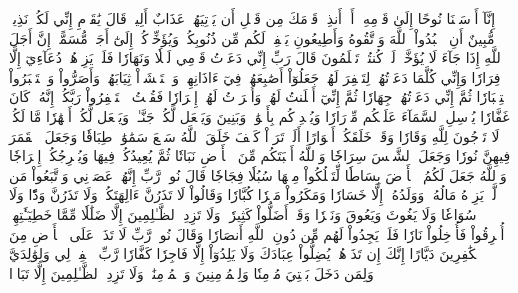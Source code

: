 إِنَّآ أَرۡسَلۡنَا نُوحًا إِلَىٰ قَوۡمِهِۦٓ أَنۡ أَنذِرۡ قَوۡمَكَ مِن قَبۡلِ أَن يَأۡتِيَهُمۡ عَذَابٌ أَلِيمٞ
قَالَ يَٰقَوۡمِ إِنِّي لَكُمۡ نَذِيرٞ مُّبِينٌ
أَنِ ٱعۡبُدُواْ ٱللَّهَ وَٱتَّقُوهُ وَأَطِيعُونِ
يَغۡفِرۡ لَكُم مِّن ذُنُوبِكُمۡ وَيُؤَخِّرۡكُمۡ إِلَىٰٓ أَجَلٖ مُّسَمًّىۚ إِنَّ أَجَلَ ٱللَّهِ إِذَا جَآءَ لَا يُؤَخَّرُۚ لَوۡ كُنتُمۡ تَعۡلَمُونَ
قَالَ رَبِّ إِنِّي دَعَوۡتُ قَوۡمِي لَيۡلٗا وَنَهَارٗا
فَلَمۡ يَزِدۡهُمۡ دُعَآءِيٓ إِلَّا فِرَارٗا
وَإِنِّي كُلَّمَا دَعَوۡتُهُمۡ لِتَغۡفِرَ لَهُمۡ جَعَلُوٓاْ أَصَٰبِعَهُمۡ فِيٓ ءَاذَانِهِمۡ وَٱسۡتَغۡشَوۡاْ ثِيَابَهُمۡ وَأَصَرُّواْ وَٱسۡتَكۡبَرُواْ ٱسۡتِكۡبَارٗا
ثُمَّ إِنِّي دَعَوۡتُهُمۡ جِهَارٗا
ثُمَّ إِنِّيٓ أَعۡلَنتُ لَهُمۡ وَأَسۡرَرۡتُ لَهُمۡ إِسۡرَارٗا
فَقُلۡتُ ٱسۡتَغۡفِرُواْ رَبَّكُمۡ إِنَّهُۥ كَانَ غَفَّارٗا
يُرۡسِلِ ٱلسَّمَآءَ عَلَيۡكُم مِّدۡرَارٗا
وَيُمۡدِدۡكُم بِأَمۡوَٰلٖ وَبَنِينَ وَيَجۡعَل لَّكُمۡ جَنَّـٰتٖ وَيَجۡعَل لَّكُمۡ أَنۡهَٰرٗا
مَّا لَكُمۡ لَا تَرۡجُونَ لِلَّهِ وَقَارٗا
وَقَدۡ خَلَقَكُمۡ أَطۡوَارًا
أَلَمۡ تَرَوۡاْ كَيۡفَ خَلَقَ ٱللَّهُ سَبۡعَ سَمَٰوَٰتٖ طِبَاقٗا
وَجَعَلَ ٱلۡقَمَرَ فِيهِنَّ نُورٗا وَجَعَلَ ٱلشَّمۡسَ سِرَاجٗا
وَٱللَّهُ أَنۢبَتَكُم مِّنَ ٱلۡأَرۡضِ نَبَاتٗا
ثُمَّ يُعِيدُكُمۡ فِيهَا وَيُخۡرِجُكُمۡ إِخۡرَاجٗا
وَٱللَّهُ جَعَلَ لَكُمُ ٱلۡأَرۡضَ بِسَاطٗا
لِّتَسۡلُكُواْ مِنۡهَا سُبُلٗا فِجَاجٗا
قَالَ نُوحٞ رَّبِّ إِنَّهُمۡ عَصَوۡنِي وَٱتَّبَعُواْ مَن لَّمۡ يَزِدۡهُ مَالُهُۥ وَوَلَدُهُۥٓ إِلَّا خَسَارٗا
وَمَكَرُواْ مَكۡرٗا كُبَّارٗا
وَقَالُواْ لَا تَذَرُنَّ ءَالِهَتَكُمۡ وَلَا تَذَرُنَّ وَدّٗا وَلَا سُوَاعٗا وَلَا يَغُوثَ وَيَعُوقَ وَنَسۡرٗا
وَقَدۡ أَضَلُّواْ كَثِيرٗاۖ وَلَا تَزِدِ ٱلظَّـٰلِمِينَ إِلَّا ضَلَٰلٗا
مِّمَّا خَطِيٓـَٰٔتِهِمۡ أُغۡرِقُواْ فَأُدۡخِلُواْ نَارٗا فَلَمۡ يَجِدُواْ لَهُم مِّن دُونِ ٱللَّهِ أَنصَارٗا
وَقَالَ نُوحٞ رَّبِّ لَا تَذَرۡ عَلَى ٱلۡأَرۡضِ مِنَ ٱلۡكَٰفِرِينَ دَيَّارًا
إِنَّكَ إِن تَذَرۡهُمۡ يُضِلُّواْ عِبَادَكَ وَلَا يَلِدُوٓاْ إِلَّا فَاجِرٗا كَفَّارٗا
رَّبِّ ٱغۡفِرۡ لِي وَلِوَٰلِدَيَّ وَلِمَن دَخَلَ بَيۡتِيَ مُؤۡمِنٗا وَلِلۡمُؤۡمِنِينَ وَٱلۡمُؤۡمِنَٰتِۖ وَلَا تَزِدِ ٱلظَّـٰلِمِينَ إِلَّا تَبَارَۢا